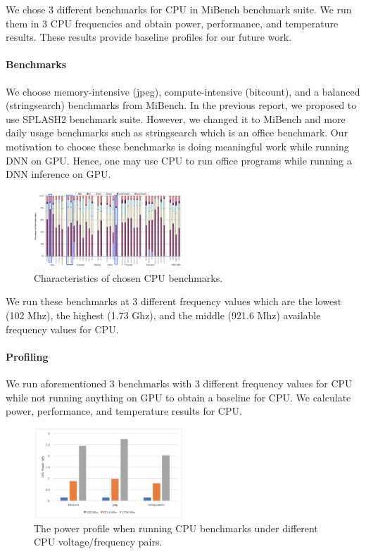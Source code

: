 We chose 3 different benchmarks for CPU in MiBench benchmark suite. We run them in 3 CPU frequencies and obtain power, performance, and temperature results. These results provide baseline profiles for our future work. 

\paragraph{Benchmarks}


We choose memory-intensive (jpeg), compute-intensive (bitcount), and a balanced (stringsearch) benchmarks from MiBench. In the previous report, we proposed to use SPLASH2 \cite{woo1995splash} benchmark suite. However, we changed it to MiBench and more daily usage benchmarks such as stringsearch which is an office benchmark. Our motivation to choose these benchmarks is doing meaningful work while running DNN on GPU. Hence, one may use CPU to run office programs while running a DNN inference on GPU. 

\begin{figure}
  \caption{Characteristics of chosen CPU benchmarks.}
  \centering
    \includegraphics[width=0.5\textwidth]{cpubench}
\end{figure}

We run these benchmarks at 3 different frequency values which are the lowest (102 Mhz), the highest (1.73 Ghz), and the middle (921.6 Mhz) available frequency values for CPU. 

\paragraph{Profiling}


We run aforementioned 3 benchmarks with 3 different frequency values for CPU while not running anything on GPU to obtain a baseline for CPU. We calculate power, performance, and temperature results for CPU. 

\begin{figure}[h]
    \centering
    \includegraphics[width=0.5\textwidth]{cpupower.png}
    \caption{The power profile when running CPU benchmarks under different CPU voltage/frequency pairs.}\label{fig:cpupower}
\end{figure}


